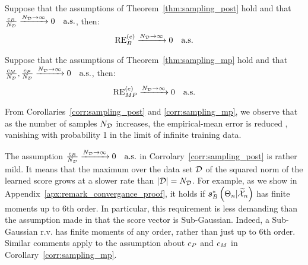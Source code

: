 \begin{corollary}\label{corr:sampling_post} 
Suppose
that the assumptions of Theorem~\ref{thm:sampling_post} hold and that $\frac{c_B}{N_{\mathcal{D}}}\xrightarrow{N_{\mathcal{D}}\rightarrow\infty}0 
{\quad \text{a.s.}}$, then:
\begin{equation}
\mathrm{RE}_B^{(e)}\xrightarrow{N_{\mathcal{D}}\rightarrow\infty}0 \quad\text{a.s.}
\end{equation}
    
\end{corollary}

\begin{corollary}\label{corr:sampling_mp} %
Suppose that the assumptions of Theorem~\ref{thm:sampling_mp} hold and that
$%
{\frac{\cm}{\nds}, \frac{\cp}{\nds}}\xrightarrow{\nds\rightarrow\infty}0 %
{\quad \text{a.s.}}$, then:
\begin{equation}
\mathrm{RE}_{MP}^{(e)}\xrightarrow{N_{\mathcal{D}}\rightarrow\infty}0 \quad\text{a.s.}
\end{equation}
    
\end{corollary}





From Corollaries~\ref{corr:sampling_post} and \ref{corr:sampling_mp}, we observe that as the number of samples $N_{\mathcal{D}}$
increases, the %
{empirical}-mean error is reduced%
{, vanishing with probability 1 in the limit of infinite training data}.
 \begin{remark}\label{remark:mean_error_convergance}
    The assumption  $\frac{c_B}{N_{\mathcal{D}}}\xrightarrow{N_{\mathcal{D}}\rightarrow\infty}0 {\quad \text{a.s.}}$ in Corrolary~\ref{corr:sampling_post} is 
    {rather mild. 
    It means that the maximum over the data set $\mathcal{D}$ of the squared norm of the learned score grows at a slower rate than $|\mathcal{D}|=N_{\mathcal{D}}$. For example, 
    {as we show in Appendix~\ref{apx:remark_convergance_proof}}, it holds if $\bm{s}_{B}^*\left(\Theta_n|\widetilde{\mathcal{X}}_n\right)$ has finite moments up to 6th order. In particular, this requirement is less demanding than the assumption made in \cite{crafts2023bayesian} that the score vector is
        Sub-Gaussian. Indeed, a Sub-Gaussian r.v. has finite moments of any order, rather than just up to 6th order.} Similar comments apply to the assumption about $c_P$ and $c_M$ in Corollary~\ref{corr:sampling_mp}.
\end{remark}

